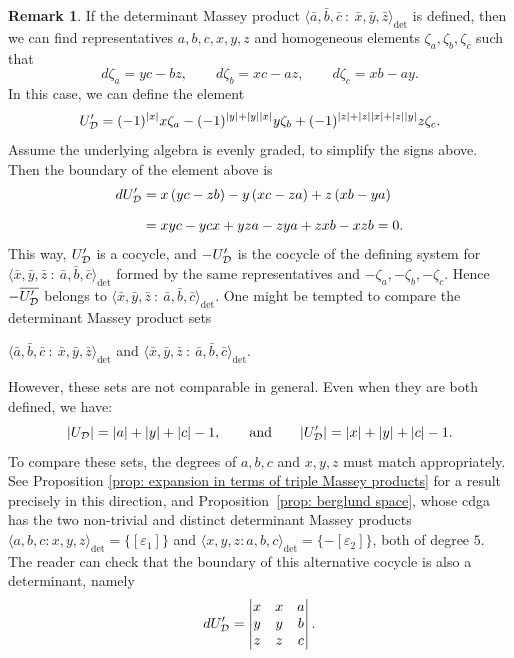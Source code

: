 \documentclass[11pt]{article}
\theoremstyle{definition}
\theoremstyle{definition}
\newtheorem{remark}[theorem]{Remark}
\begin{document}
\begin{remark} 
\label{rmk: Determinant Massey products appear in pairs}
If the determinant Massey product $\langle \bar a,\bar b,\bar c \ :\ \bar x, \bar y, \bar z\rangle_{\det}$ is defined, 
then we can find representatives 
$a,b,c,x,y,z$ and homogeneous elements $\zeta_a,\zeta_b,\zeta_c$ such that
\begin{equation*}
d\zeta_a=yc-bz, \quad \quad 
d\zeta_b=xc-az, \quad \quad 
d\zeta_c=xb-ay.
\end{equation*}
In this case, we can define the element 
\begin{equation*}
U'_\mathcal D = (-1)^{|x|}x\zeta_a -(-1)^{|y|+|y||x|}y\zeta_b+(-1)^{|z|+|z||x|+|z||y|}z\zeta_c.
\end{equation*}
Assume the underlying algebra is evenly graded, to simplify the signs above.
Then the boundary of the element above is
\begin{align*}
    dU'_{\mathcal D} &= x\left(yc- zb\right) 
    - y\left(xc-za\right) + z\left(xb-ya\right) \\[0.25cm]
    &= xyc - ycx + yza - zya + zxb - xzb=0.
\end{align*}
This way, $U'_{\mathcal D}$ is a cocycle, 
and $-U'_{\mathcal D}$ is the cocycle of the defining system for 
$\langle \bar x,\bar y,\bar z \ : \ \bar a, \bar b, \bar c\rangle_{\det}$ 
formed by the same representatives and $-\zeta_a,-\zeta_b,-\zeta_c$.
Hence $-\overline{U'_{\mathcal D}}$ belongs to $\langle \bar x,\bar y,\bar z \ : \ \bar a, \bar b, \bar c\rangle_{\det}$.
One might be tempted to compare the determinant Massey product sets 
\begin{center}
   $\langle \bar a,\bar b,\bar c \ :\ \bar x, \bar y, \bar z\rangle_{\det}$ \quad and  \quad 
$\langle \bar x,\bar y,\bar z \ : \ \bar a, \bar b, \bar c\rangle_{\det}$. 
\end{center}
However, these sets are not comparable in general. Even when they are both defined, we have: 
\begin{equation*}
|U_\mathcal D| = |a|+|y|+|c|-1, \qquad \textrm{and} \qquad
|U'_\mathcal{D}| = |x|+|y|+|c|-1.
\end{equation*}
To compare these sets, the degrees of $a,b,c$ and $x,y,z$ must match appropriately.
See Proposition \ref{prop: expansion in terms of triple Massey products} for a result precisely in this direction, 
and Proposition~\ref{prop: berglund space},
whose cdga has the two non-trivial and distinct determinant Massey products
$\langle a,b,c : x,y,z\rangle_{\det}=\{[\varepsilon_1]\}$ and 
$\langle x,y,z : a,b,c\rangle_{\det}=\{-[\varepsilon_2]\}$, both of degree $5$.
The reader can check that the boundary of this alternative cocycle is also a determinant, namely
\begin{equation*}
dU_{\mathcal D}' = \begin{vmatrix}
x & x & a \\
y & y & b \\
z & z & c 
\end{vmatrix}.
\end{equation*}
\end{remark}
\end{document}
